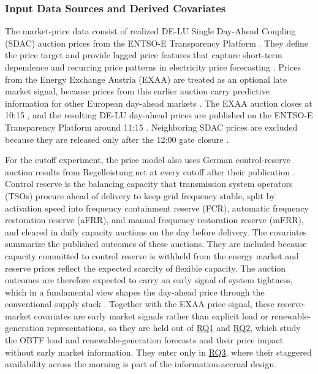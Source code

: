\subsubsection{Input Data Sources and Derived Covariates}
\label{sec:input_data_sources}

The market-price data consist of realized \mbox{DE-LU} Single Day-Ahead Coupling (SDAC)
auction prices from the \mbox{ENTSO-E} Transparency Platform
\cite{entsoeTransparency}. They define the price target and provide lagged
price features that capture short-term dependence and recurring price patterns
in electricity price forecasting \cite{weron2014electricity,lago2021forecasting}.
Prices from the Energy Exchange Austria (EXAA) are treated as an
optional late market signal, because prices from this earlier auction carry
predictive information for other European day-ahead markets
\cite{ziel2015exaa}. The EXAA auction closes at 10:15
\cite{exaaTradingRules2025}, and the resulting \mbox{DE-LU} day-ahead prices are
published on the \mbox{ENTSO-E} Transparency Platform around 11:15
\cite{entsoeTransparency,eiser2026operational}.
Neighboring SDAC prices are excluded because they are released only after the
12:00 gate closure \cite{epexSpotPowerMarket}.

For the cutoff experiment, the price model also uses German control-reserve
auction results from Regelleistung.net at every cutoff after their publication
\cite{regelleistungNet2026}. Control reserve is the
balancing capacity that transmission system operators (TSOs) procure ahead of delivery
to keep grid frequency stable, split by activation speed into frequency
containment reserve (FCR), automatic frequency restoration reserve (aFRR), and manual
frequency restoration reserve (mFRR), and cleared in daily capacity auctions on the day
before delivery. The covariates summarize the published outcomes of these
auctions. They are included because capacity committed to control reserve is
withheld from the energy market and reserve prices reflect the expected scarcity
of flexible capacity. The auction outcomes are therefore expected to carry an
early signal of system tightness, which in a fundamental view shapes the
day-ahead price through the conventional supply stack \cite{pape2016fundamentals}. Together with the EXAA price signal,
these reserve-market covariates are early market signals rather than explicit
load or renewable-generation representations, so they are held out of \hyperlink{rq:component_forecast_quality}{RQ1}
and \hyperlink{rq:price_impact_generated_forecasts}{RQ2}, which study the
OBTF load and renewable-generation forecasts and their price impact without early market
information. They enter only in
\hyperlink{rq:cutoff_sensitivity}{RQ3}, where their staggered availability
across the morning is part of the information-accrual design.

